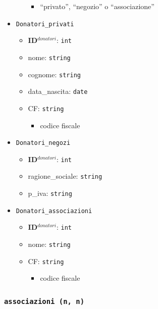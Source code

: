 \documentclass[]{article}
\providecommand{\tightlist}{%
  \setlength{\itemsep}{0pt}\setlength{\parskip}{0pt}}
\begin{document}
\begin{itemize}
\begin{itemize}
    \begin{itemize}
    \tightlist
    \item
      ``privato'', ``negozio'' o ``associazione''
    \end{itemize}
  \end{itemize}
\item
  \texttt{Donatori\_privati}

  \begin{itemize}
  \tightlist
  \item
    \textbf{ID}\(^{donatori}\): \texttt{int}
  \item
    nome: \texttt{string}
  \item
    cognome: \texttt{string}
  \item
    data\_nascita: \texttt{date}
  \item
    CF: \texttt{string}

    \begin{itemize}
    \tightlist
    \item
      codice fiscale
    \end{itemize}
  \end{itemize}
\item
  \texttt{Donatori\_negozi}

  \begin{itemize}
  \tightlist
  \item
    \textbf{ID}\(^{donatori}\): \texttt{int}
  \item
    ragione\_sociale: \texttt{string}
  \item
    p\_iva: \texttt{string}
  \end{itemize}
\item
  \texttt{Donatori\_associazioni}

  \begin{itemize}
  \tightlist
  \item
    \textbf{ID}\(^{donatori}\): \texttt{int}
  \item
    nome: \texttt{string}
  \item
    CF: \texttt{string}

    \begin{itemize}
    \tightlist
    \item
      codice fiscale
    \end{itemize}
  \end{itemize}
\end{itemize}

\hypertarget{associazioni-n-n}{%
\subsubsection{\texorpdfstring{\texttt{associazioni\ (n,\ n)}}{associazioni (n, n)}}\label{associazioni-n-n}}
\end{document}
